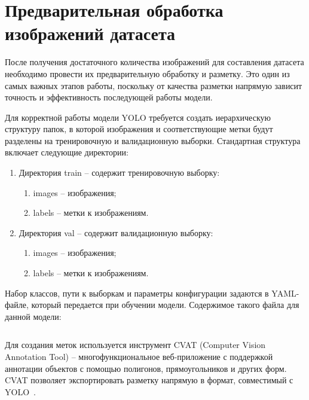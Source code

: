 \section{Предварительная обработка изображений датасета}

После получения достаточного количества изображений для составления датасета необходимо провести их предварительную обработку и разметку. Это один из самых важных этапов работы, поскольку от качества разметки напрямую зависит точность и эффективность последующей работы модели.

Для корректной работы модели YOLO требуется создать иерархическую структуру папок, в которой изображения и соответствующие метки будут разделены на тренировочную и валидационную выборки. Стандартная структура включает следующие директории:

\begin{enumerate}
    \item Директория train -- содержит тренировочную выборку:
    \begin{enumerate}
        \item images -- изображения;
        \item labels -- метки к изображениям.
    \end{enumerate}
    \item Директория val -- содержит валидационную выборку:
    \begin{enumerate}
        \item images -- изображения;
        \item labels -- метки к изображениям.
    \end{enumerate}
\end{enumerate}

Набор классов, пути к выборкам и параметры конфигурации задаются в YAML-файле, который передается при обучении модели. Содержимое такого файла для данной модели:

\begin{code}
\vspace{-0.5cm}
{\small
\inputminted[mathescape,linenos,frame=lines,breaklines]{yaml}{code/train_captcha.yaml}
}
\end{code}
\vspace{-0.4cm}

Для создания меток используется инструмент CVAT (Computer Vision Annotation Tool) -- многофункциональное веб-приложение с поддержкой аннотации объектов с помощью полигонов, прямоугольников и других форм. CVAT позволяет экспортировать разметку напрямую в формат, совместимый с YOLO~\cite{CVAT}.

